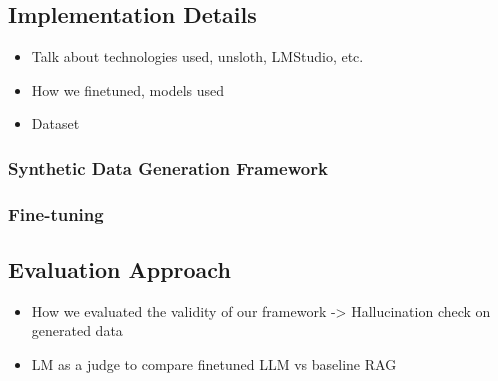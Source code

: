 \subsection{Implementation Details}
\begin{itemize}
  \item Talk about technologies used, unsloth, LMStudio, etc.
  \item How we finetuned, models used
  \item Dataset
\end{itemize}

\subsubsection{Synthetic Data Generation Framework}


\subsubsection{Fine-tuning}

\subsection{Evaluation Approach}
\begin{itemize}
  \item How we evaluated the validity of our framework -> Hallucination check on generated data 
  \item LM as a judge to compare finetuned LLM vs baseline RAG
\end{itemize}
